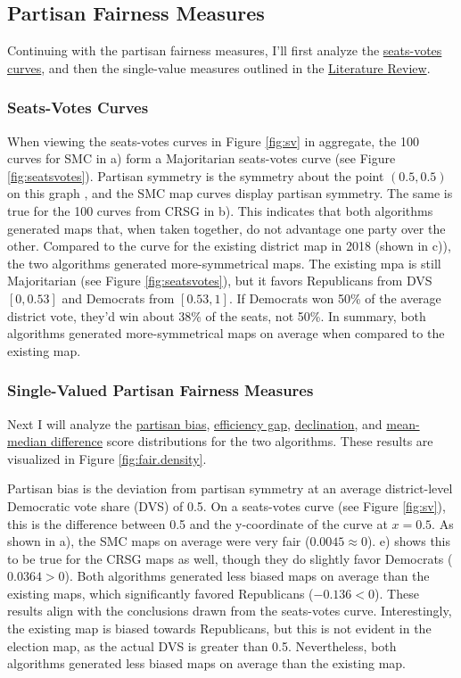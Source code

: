 \subsection{Partisan Fairness Measures}

Continuing with the partisan fairness measures, I'll first analyze the \hyperref[sec:seatsvotes]{seats-votes curves}, and then the single-value measures outlined in the \hyperref[sec:litreview]{Literature Review}. 

\subsubsection{Seats-Votes Curves}

When viewing the seats-votes curves in Figure \ref{fig:sv} in aggregate, the 100 curves for SMC in a) form a Majoritarian seats-votes curve (see Figure \ref{fig:seatsvotes}). Partisan symmetry is the symmetry about the point $(0.5, 0.5)$ on this graph \parencite{katz2020}, and the SMC map curves display partisan symmetry. The same is true for the 100 curves from CRSG in b). This indicates that both algorithms generated maps that, when taken together, do not advantage one party over the other. Compared to the curve for the existing district map in 2018 (shown in c)), the two algorithms generated more-symmetrical maps. The existing mpa is still Majoritarian (see Figure \ref{fig:seatsvotes}), but it favors Republicans from DVS $[0, 0.53]$ and Democrats from $[0.53, 1]$. If Democrats won 50\% of the average district vote, they'd win about 38\% of the seats, not 50\%. In summary, both algorithms generated more-symmetrical maps on average when compared to the existing map. 

\subsubsection{Single-Valued Partisan Fairness Measures}

Next I will analyze the \hyperref[sec:bias]{partisan bias}, \hyperref[sec:effgap]{efficiency gap}, \hyperref[sec:declination]{declination}, and \hyperref[sec:meanmed]{mean-median difference} score distributions for the two algorithms. These results are visualized in Figure \ref{fig:fair.density}.

Partisan bias is the deviation from partisan symmetry at an average district-level Democratic vote share (DVS) of 0.5. On a seats-votes curve (see Figure \ref{fig:sv}), this is the difference between 0.5 and the y-coordinate of the curve at $x=0.5$. As shown in a), the SMC maps on average were very fair ($0.0045 \approx 0$). e) shows this to be true for the CRSG maps as well, though they do slightly favor Democrats ($0.0364 > 0$). Both algorithms generated less biased maps on average than the existing maps, which significantly favored Republicans ($-0.136 < 0$). These results align with the conclusions drawn from the seats-votes curve. Interestingly, the existing map is biased towards Republicans, but this is not evident in the election map, as the actual DVS is greater than 0.5. Nevertheless, both algorithms generated less biased maps on average than the existing map. 

